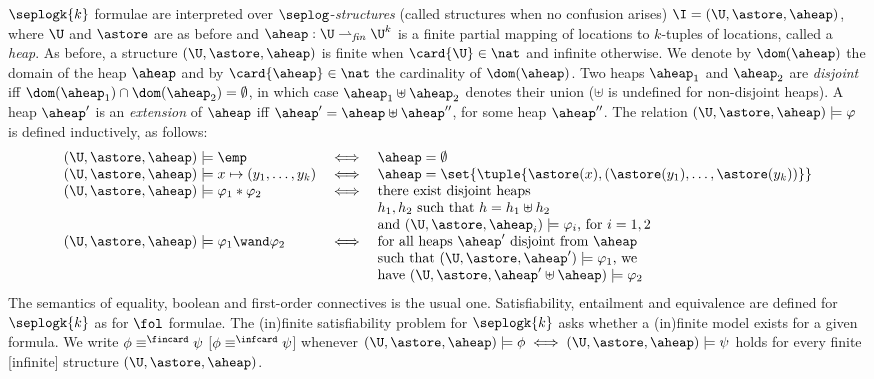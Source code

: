 $\seplogk{k}$ formulae are interpreted over
$\seplog$-\emph{structures} (called structures when no confusion
arises) $\I = (\U, \astore, \aheap)$, where $\U$ and $\astore$ are as
before and $\aheap : \U \rightharpoonup_{\mathit{fin}} \U^k$ is a
finite partial mapping of locations to $k$-tuples of locations, called
a \emph{heap}. As before, a structure $(\U,\astore,\aheap)$ is finite
when $\card{\U} \in \nat$ and infinite otherwise. We denote by
$\dom(\aheap)$ the domain of the heap $\aheap$ and by $\card{\aheap}
\in \nat$ the cardinality of $\dom(\aheap)$. Two heaps $\aheap_1$ and
$\aheap_2$ are \emph{disjoint} iff $\dom(\aheap_1) \cap \dom(\aheap_2)
= \emptyset$, in which case $\aheap_1 \uplus \aheap_2$ denotes their
union ($\uplus$ is undefined for non-disjoint heaps). A heap $\aheap'$
is an \emph{extension} of $\aheap$ iff $\aheap' = \aheap \uplus
\aheap''$, for some heap $\aheap''$. The relation $(\U,\astore,\aheap)
\models \varphi$ is defined inductively, as follows:
\[\begin{array}{lcl}
(\U,\astore,\aheap) \models \emp & \iff & \aheap = \emptyset \\ 
(\U,\astore,\aheap) \models x \mapsto (y_1,\ldots,y_k) & \iff &
\aheap = \set{\tuple{\astore(x),(\astore(y_1), \ldots, \astore(y_k))}}  \\
(\U,\astore,\aheap) \models \varphi_1 * \varphi_2 & \iff & \text{there exist disjoint heaps} \\ 
&& h_1,h_2 \text{ such that } h=h_1\uplus h_2 \\
&& \text{and } (\U,\astore,\aheap_i) \models \varphi_i \text{, for $i = 1,2$} \\
(\U,\astore,\aheap) \models \varphi_1 \wand \varphi_2 & \iff &
\text{for all heaps $\aheap'$ disjoint from $\aheap$} \\
&& \text{such that } (\U,\astore,\aheap') \models \varphi_1 \text{, we} \\
&& \text{have } (\U,\astore,\aheap'\uplus\aheap) \models \varphi_2
\end{array}\]
The semantics of equality, boolean and first-order connectives is the
usual one. Satisfiability, entailment and equivalence are defined for
$\seplogk{k}$ as for $\fol$ formulae. The (in)finite satisfiability
problem for $\seplogk{k}$ asks whether a (in)finite model exists for a
given formula. We write $\phi \equiv^{\fincard} \psi$ [$\phi
  \equiv^{\infcard} \psi$] whenever $(\U,\astore,\aheap) \models \phi
\iff (\U,\astore,\aheap) \models \psi$ holds for every finite
     [infinite] structure $(\U,\astore,\aheap)$.

